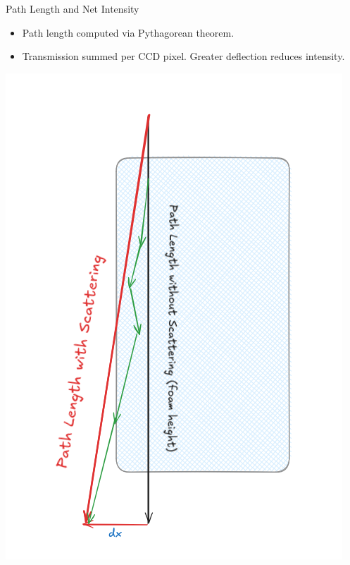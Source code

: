 \documentclass[aspectratio=169,xcolor=dvipsnames]{beamer}
\begin{document}
\begin{frame}{Path Length and Net Intensity}
\begin{itemize}
    \item Path length computed via Pythagorean theorem.
    \item Transmission summed per CCD pixel. Greater deflection reduces intensity.
\end{itemize}

\vspace{-0.2cm} %

\begin{center}
\begin{minipage}{0.3\textwidth}
  \centering
  \includegraphics[width=\linewidth]{pathlength.png}
\end{minipage}
\hspace{0.05\textwidth}

\end{center}
\end{frame}
\end{document}
